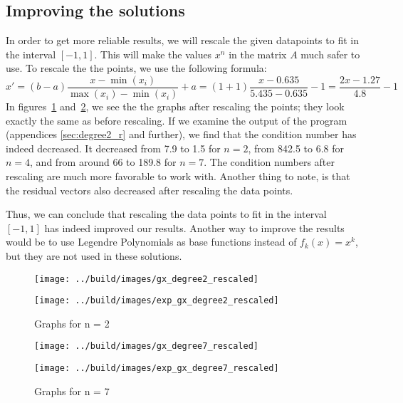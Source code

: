 \documentclass[11pt, a4paper, titlepage, openright]{article}
\begin{document}
    \subsection{Improving the solutions}
    In order to get more reliable results, we will rescale the given datapoints to fit in the interval \([-1, 1]\). This will make the
    values \(x^n\) in the matrix \(A\) much safer to use. To rescale the the points, we use the following formula:
    \[x' = (b-a)\frac{x - \min(x_i)}{\max(x_i) - \min(x_i)} + a = (1+1)\frac{x - 0.635}{5.435 - 0.635} - 1 = \frac{2x - 1.27}{4.8} - 1 \]
    In figures~\ref{fig:n2_r} and~\ref{fig:n7_r}, we see the the graphs after rescaling the points; they look exactly the same as before rescaling. 
    If we examine the output of the program (appendices \ref{sec:degree2_r} and further), we find that the condition number has indeed decreased.
    It decreased from 7.9 to 1.5 for \(n = 2\), from 842.5 to 6.8 for \(n = 4\), and from around 6\mbox{}6 to 189.8 for \(n=7\).
    The condition numbers after rescaling are much more favorable to work with.
    Another thing to note, is that the residual vectors also decreased after rescaling the data points.
    
    Thus, we can conclude that rescaling the data points to fit in the interval \([-1, 1]\) has indeed improved our results.
    Another way to improve the results would be to use Legendre Polynomials as base functions instead of \( f_k(x) = x^k \), but they are not used
    in these solutions.
    \begin{figure}[H]
        \begin{minipage}[b]{0.49\textwidth}
            \texttt{[image: ../build/images/gx\_degree2\_rescaled]}
        \end{minipage}
        \hfill
        \begin{minipage}[b]{0.49\textwidth}
            \texttt{[image: ../build/images/exp\_gx\_degree2\_rescaled]}
        \end{minipage}
        \caption{Graphs for n = 2}
        \label{fig:n2_r}
    \end{figure}
    
    \begin{figure}[H]
        \begin{minipage}[b]{0.49\textwidth}
            \texttt{[image: ../build/images/gx\_degree7\_rescaled]}
        \end{minipage}
        \hfill
        \begin{minipage}[b]{0.49\textwidth}
            \texttt{[image: ../build/images/exp\_gx\_degree7\_rescaled]}
        \end{minipage}
        \caption{Graphs for n = 7}
        \label{fig:n7_r}
    \end{figure}
\end{document}
